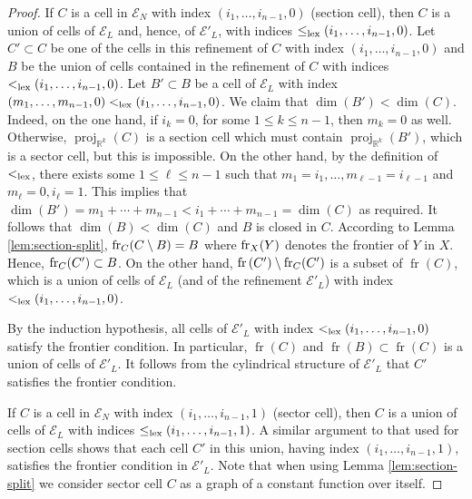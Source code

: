 \documentclass[
]{book}
\theoremstyle{definition}
\theoremstyle{definition}
\theoremstyle{definition}
\theoremstyle{definition}
\theoremstyle{remark}
\begin{document}
\begin{proof}
If \(C\) is a cell in \({\mathcal E}_N\) with index \((i_1, \ldots ,i_{n-1},0)\) (section cell),
then \(C\) is a union of cells of \({\mathcal E}_L\) and, hence, of \(\mathcal{E}'_L\), with indices \(\le_{\rm{lex}}(i_1, \ldots ,i_{n-1} ,0)\).
Let \(C' \subset C\) be one of the cells in this refinement of \(C\) with index \((i_1, \ldots ,i_{n-1} ,0)\) and \(B\) be
the union of cells contained in the refinement of \(C\) with indices \(<_{\rm{lex}}(i_1, \ldots ,i_{n-1} ,0)\).
Let \(B' \subset B\) be a cell of \({\mathcal E}_L\) with index \((m_1,\ldots,m_{n-1},0) <_{\rm{lex}}(i_1,\ldots,i_{n-1},0)\). We claim that \(\dim(B') < \dim(C)\).
Indeed, on the one hand, if \(i_k = 0\), for some \(1\le k \le n-1\), then \(m_k = 0\) as well. Otherwise, \(\operatorname{proj}_{\mathbb{R}^k}(C)\) is a section cell which must contain \(\operatorname{proj}_{\mathbb{R}^k}(B')\), which is a sector cell, but this is impossible.
On the other hand, by the definition of \(<_{\rm{lex}}\), there exists some \(1\le \ell \le n-1\) such that \(m_1 = i_1, \ldots, m_{\ell-1} = i_{\ell-1}\) and \(m_\ell = 0, i_\ell = 1\). This implies that \(\dim(B') = m_1 + \cdots + m_{n-1} < i_1 + \cdots + m_{n-1} = \dim(C)\) as required. It follows that \(\dim(B) < \dim(C)\) and \(B\) is closed in \(C\).
According to Lemma \ref{lem:section-split}, \({\rm{fr}}_C (C \setminus B)=B\) where \({\rm{fr}}_X(Y)\) denotes the frontier of \(Y\) in \(X\).
Hence, \({\rm{fr}}_C (C') \subset B\).
On the other hand, \({\operatorname{fr} \left( C' \right)} \setminus {\rm{fr}}_C (C')\) is a subset of \({\operatorname{fr} \left( C \right)}\), which is a union of cells of \(\mathcal{E}_L\) (and of the refinement \(\mathcal{E}'_L\)) with index \(<_{\rm{lex}}(i_1,\ldots,i_{n-1},0)\).

By the induction hypothesis, all cells of \(\mathcal{E}'_L\) with index \(<_{\rm{lex}}(i_1,\ldots,i_{n-1},0)\) satisfy the frontier condition. In particular, \({\operatorname{fr} \left( C \right)}\) and \({\operatorname{fr} \left( B \right)}\subset {\operatorname{fr} \left( C \right)}\) is a union of cells of \(\mathcal{E}'_L\).
It follows from the cylindrical structure of \(\mathcal{E}'_L\) that \(C'\) satisfies the frontier condition.

If \(C\) is a cell in \({\mathcal E}_N\) with index \((i_1, \ldots ,i_{n-1} ,1)\) (sector cell),
then \(C\) is a union of cells of \({\mathcal E}_L\) with indices \(\le_{\rm{lex}}(i_1, \ldots ,i_{n-1} ,1)\).
A similar argument to that used for section cells shows that each cell \(C'\) in this union,
having index \((i_1, \ldots ,i_{n-1} ,1)\), satisfies the frontier condition in \(\mathcal{E}'_L\). Note that when using
Lemma \ref{lem:section-split} we consider sector cell \(C\) as a graph of a constant function over itself.


\end{proof}
\end{document}
